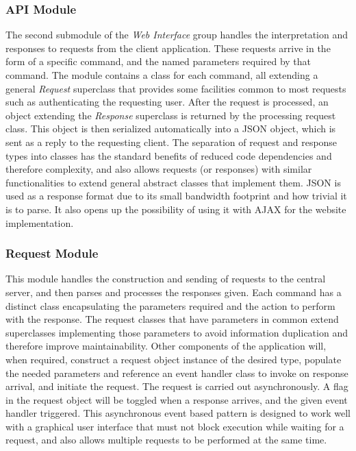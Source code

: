 \subsubsection{API Module}
The second submodule of the \emph{Web Interface} group handles the interpretation and responses to requests from the client application. These requests arrive in the form of a specific command, and the named parameters required by that command. The module contains a class for each command, all extending a general \emph{Request} superclass that provides some facilities common to most requests such as authenticating the requesting user. After the request is processed, an object extending the \emph{Response} superclass is returned by the processing request class. This object is then serialized automatically into a JSON object, which is sent as a reply to the requesting client. The separation of request and response types into classes has the standard benefits of reduced code dependencies and therefore complexity, and also allows requests (or responses) with similar functionalities to extend general abstract classes that implement them. JSON is used as a response format due to its small bandwidth footprint and how trivial it is to parse. It also opens up the possibility of using it with AJAX for the website implementation.

\subsubsection{Request Module}
This module handles the construction and sending of requests to the central server, and then parses and processes the responses given. Each command has a distinct class encapsulating the parameters required and the action to perform with the response. The request classes that have parameters in common extend superclasses implementing those parameters to avoid information duplication and therefore improve maintainability. Other components of the application will, when required, construct a request object instance of the desired type, populate the needed parameters and reference an event handler class to invoke on response arrival, and initiate the request. The request is carried out asynchronously. A flag in the request object will be toggled when a response arrives, and the given event handler triggered. This asynchronous event based pattern is designed to work well with a graphical user interface that must not block execution while waiting for a request, and also allows multiple requests to be performed at the same time.


